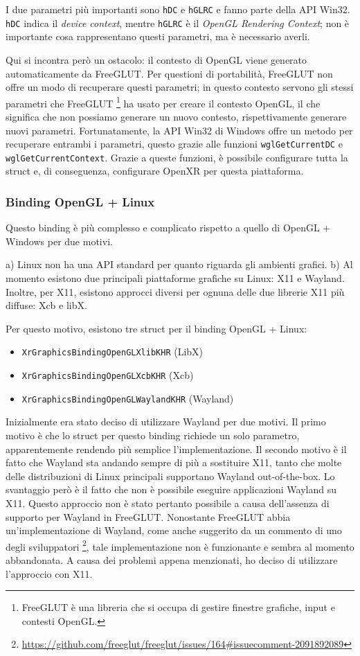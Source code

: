 \documentclass[twoside]{supsistudent}
\begin{document}
I due parametri più importanti sono \texttt{hDC} e \texttt{hGLRC} e fanno parte della API Win32. \texttt{hDC} indica il \textit{device context}, mentre \texttt{hGLRC} è il \textit{OpenGL Rendering Context}; non è importante cosa rappresentano questi parametri, ma è necessario averli.

Qui si incontra però un ostacolo: il contesto di OpenGL viene generato automaticamente da FreeGLUT. Per questioni di portabilità, FreeGLUT non offre un modo di recuperare questi parametri; in questo contesto servono gli stessi parametri che FreeGLUT \footnote{FreeGLUT è una libreria che si occupa di gestire finestre grafiche, input e contesti OpenGL.} ha usato per creare il contesto OpenGL, il che significa che non possiamo generare un nuovo contesto, rispettivamente generare nuovi parametri. Fortunatamente, la API Win32 di Windows offre un metodo per recuperare entrambi i parametri, questo grazie alle funzioni \texttt{wglGetCurrentDC} e \texttt{wglGetCurrentContext}. Grazie a queste funzioni, è possibile configurare tutta la struct e, di conseguenza, configurare OpenXR per questa piattaforma.

\subsubsection{Binding OpenGL + Linux}

Questo binding è più complesso e complicato rispetto a quello di OpenGL + Windows per due motivi.

a) Linux non ha una API standard per quanto riguarda gli ambienti grafici. b) Al momento esistono due principali piattaforme grafiche su Linux: X11 e Wayland. Inoltre, per X11, esistono approcci diversi per ognuna delle due librerie X11 più diffuse: Xcb e libX.

Per questo motivo, esistono tre struct per il binding OpenGL + Linux:

\begin{itemize}
  \item \texttt{XrGraphicsBindingOpenGLXlibKHR} (LibX)
  \item \texttt{XrGraphicsBindingOpenGLXcbKHR} (Xcb)
  \item \texttt{XrGraphicsBindingOpenGLWaylandKHR} (Wayland)
\end{itemize}

Inizialmente era stato deciso di utilizzare Wayland per due motivi. Il primo motivo è che lo struct per questo binding richiede un solo parametro, apparentemente rendendo più semplice l'implementazione. Il secondo motivo è il fatto che Wayland sta andando sempre di più a sostituire X11, tanto che molte delle distribuzioni di Linux principali supportano Wayland out-of-the-box. Lo svantaggio però è il fatto che non è possibile eseguire applicazioni Wayland su X11. Questo approccio non è stato pertanto possibile a causa dell'assenza di supporto per Wayland in FreeGLUT. Nonostante FreeGLUT abbia un'implementazione di Wayland, come anche suggerito da un commento di uno degli sviluppatori \footnote{\url{https://github.com/freeglut/freeglut/issues/164\#issuecomment-2091892089}}, tale implementazione non è funzionante e sembra al momento abbandonata. A causa dei problemi appena menzionati, ho deciso di utilizzare l'approccio con X11.
\end{document}
